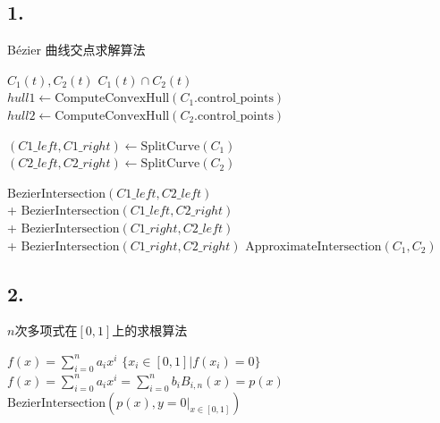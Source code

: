 \documentclass[utf8]{ctexart}
\begin{document}
\subsection*{1.}
\begin{algorithm}[H]
    \label{alg2}
    \caption{Bézier 曲线交点求解算法}
    \renewcommand{\algorithmicrequire}{\textbf{Input:}}
    \renewcommand{\algorithmicensure}{\textbf{Output:}}
    \begin{algorithmic}[1]
        \REQUIRE $C_1(t),C_2(t)$
        \ENSURE $C_1(t)\cap C_2(t)$
        \STATE $hull1 \gets \text{ComputeConvexHull}(C_1.\text{control\_points})$
            \STATE $hull2 \gets \text{ComputeConvexHull}(C_2.\text{control\_points})$

                \RETURN []
            \ENDIF

                \STATE $(C1\_left, C1\_right) \gets \text{SplitCurve}(C_1)$
                \STATE $(C2\_left, C2\_right) \gets \text{SplitCurve}(C_2)$

                \RETURN $\text{BezierIntersection}(C1\_left, C2\_left)$ \\
                + $\text{BezierIntersection}(C1\_left, C2\_right)$ \\
                + $\text{BezierIntersection}(C1\_right, C2\_left)$ \\
                + $\text{BezierIntersection}(C1\_right, C2\_right)$
            \ENDIF
            \RETURN $\text{ApproximateIntersection}(C_1, C_2)$
    \end{algorithmic}
\end{algorithm}

\subsection*{2.}
\begin{algorithm}[H]
    \label{alg3}
    \caption{$n$次多项式在$[0,1]$上的求根算法}
    \renewcommand{\algorithmicrequire}{\textbf{Input:}}
    \renewcommand{\algorithmicensure}{\textbf{Output:}}
    \begin{algorithmic}[1]
        \REQUIRE $f(x) =\sum_{i=0}^{n}a_ix^i$
        \ENSURE $\{x_i\in [0,1] \vert f(x_i)=0\}$
        \STATE $f(x) =\sum_{i=0}^{n}a_ix^i = \sum_{i=0}^nb_iB_{i,n}(x) = p(x)$
        \RETURN $\text{BezierIntersection}(p(x), y=0|_{x\in [0,1]})$
    \end{algorithmic}
\end{algorithm}
\end{document}
